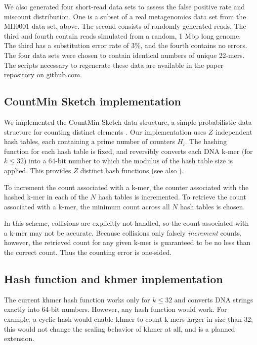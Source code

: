 \documentclass[10pt]{article}
\begin{document}
We also generated four short-read data sets to assess the false
positive rate and miscount distribution. One is a subset of a real
metagenomics data set from the MH0001 data set, above. The second
consists of randomly generated reads. The third and fourth contain
reads simulated from a random, 1 Mbp long genome.  The third has a
substitution error rate of 3\%, and the fourth contains no errors. The
four data sets were chosen to contain identical numbers of unique
22-mers.  The scripts necessary to regenerate these data are available
in the paper repository on github.com.

\subsection*{CountMin Sketch implementation}

We implemented the CountMin Sketch data structure, a simple
probabilistic data structure for counting distinct elements
\cite{Cormode2005}.  Our implementation uses $Z$ independent hash
tables, each containing a prime number of counters $H_i$.  The hashing
function for each hash table is fixed, and reversibly converts each
DNA k-mer (for $k \le 32$) into a 64-bit number to which the modulus of
the hash table size is applied.  This provides $Z$ distinct hash
functions (see also \cite{adina2013}).

To increment the count associated with a k-mer, the counter associated
with the hashed k-mer in each of the $N$ hash tables is incremented.
To retrieve the count associated with a k-mer, the minimum count
across all $N$ hash tables is chosen.

In this scheme, collisions are explicitly not handled, so the count
associated with a k-mer may not be accurate. Because collisions only
falsely {\em increment} counts, however, the retrieved count for any
given k-mer is guaranteed to be no less than the correct count.  Thus
the counting error is one-sided.

\subsection*{Hash function and khmer implementation}

The current khmer hash function works only for $k \le 32$ and converts
DNA strings exactly into 64-bit numbers.  However, any hash function
would work. For example, a cyclic hash would enable khmer to count
k-mers larger in size than 32; this would not change the scaling
behavior of khmer at all, and is a planned extension.
\end{document}
